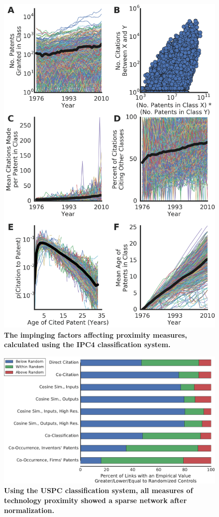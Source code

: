 \documentclass[]{svjour3}
\begin{document}
\begin{figure}[]
\centering
\includegraphics[width=.7\textwidth]{figs/Impinging_Factors_IPC4.png} 
\caption{\textbf{The impinging factors affecting proximity measures, calculated using the IPC4 classification system.}}
\end{figure}

\begin{figure}[p!]
\centering
\includegraphics[width=.7\textwidth]{figs/Related_Unrelated_Percentages_Two_Column_USPC.pdf} 
\caption{\textbf{Using the USPC classification system, all measures of technology proximity showed a sparse network after normalization.}
}\label{related_unrelated_percentage_USPC}
\end{figure}
\end{document}
